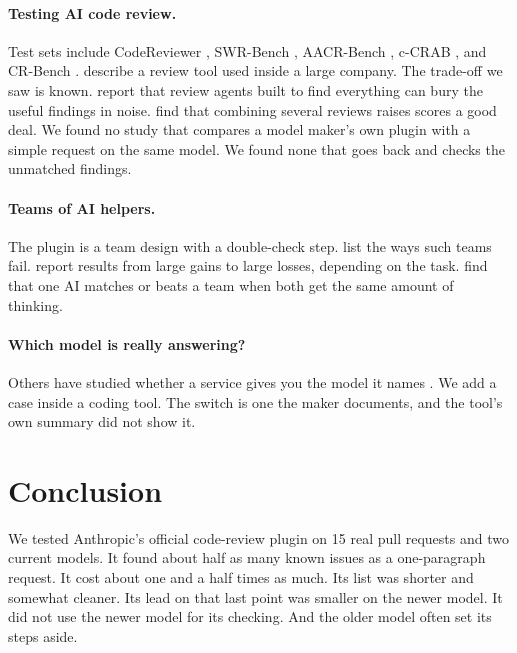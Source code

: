 \documentclass[11pt]{article}
\begin{document}
\paragraph{Testing AI code review.} Test sets include CodeReviewer \citep{li2022codereviewer}, SWR-Bench \citep{zeng2025swr}, AACR-Bench \citep{zhang2026aacr}, c-CRAB \citep{zhang2026ccrab}, and CR-Bench \citep{pereira2026crbench}. \citet{sun2025bitsai} describe a review tool used inside a large company. The trade-off we saw is known. \citet{pereira2026crbench} report that review agents built to find everything can bury the useful findings in noise. \citet{zeng2025swr} find that combining several reviews raises scores a good deal. We found no study that compares a model maker's own plugin with a simple request on the same model. We found none that goes back and checks the unmatched findings.

\paragraph{Teams of AI helpers.} The plugin is a team design with a double-check step. \citet{cemri2025mas} list the ways such teams fail. \citet{kim2025scaling} report results from large gains to large losses, depending on the task. \citet{tran2026single} find that one AI matches or beats a team when both get the same amount of thinking.

\paragraph{Which model is really answering?} Others have studied whether a service gives you the model it names \citep{gao2024equality,cai2025substitution}. We add a case inside a coding tool. The switch is one the maker documents, and the tool's own summary did not show it.

\section{Conclusion}

We tested Anthropic's official code-review plugin on 15 real pull requests and two current models. It found about half as many known issues as a one-paragraph request. It cost about one and a half times as much. Its list was shorter and somewhat cleaner. Its lead on that last point was smaller on the newer model. It did not use the newer model for its checking. And the older model often set its steps aside.
\end{document}
